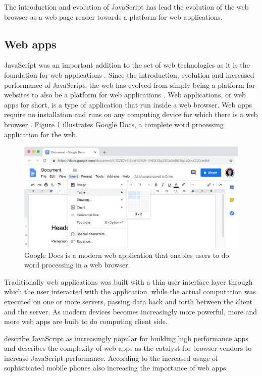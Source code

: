 The introduction and evolution of JavaScript has lead the evolution of the web browser as a web page reader towards a platform for web applications.

\subsection{Web apps}

JavaScript was an important addition to the set of web technologies as it is the foundation for web applications \parencite{ParkJungMoon2015}. Since the introduction, evolution and increased performance of JavaScript, the web has evolved from simply being a platform for websites to also be a platform for web applications \parencite{SandhuHerreraHendren2018}. Web applications, or web apps for short, is a type of application that run inside a web browser. Web apps require no installation and runs on any computing device for which there is a web browser \parencite{RatanaworabhanLivshitsZorn2010}. Figure \ref{google-docs} illustrates Google Docs, a complete word processing application for the web.

\begin{figure}[!h]
\centering
\includegraphics[width=16cm,keepaspectratio]{figures/google-docs}
\caption{Google Docs is a modern web application that enables users to do word processing in a web browser.}
\label{google-docs}
\end{figure}

Traditionally web applications was built with a thin user interface layer through which the user interacted with the application, while the actual computation was executed on one or more servers, %
passing data back and forth between the client and the server. As modern devices becomes increasingly more powerful, more and more web apps are built to do computing client side.

\textcite{SandhuHerreraHendren2018} describe JavaScript as increasingly popular for building high performance apps and \textcite{RatanaworabhanLivshitsZorn2010} describes the complexity of web apps as the catalyst for browser vendors to increase JavaScript performance. According to \textcite{RatanaworabhanLivshitsZorn2010} the increased usage of sophisticated mobile phones also increasing the importance of web apps.

